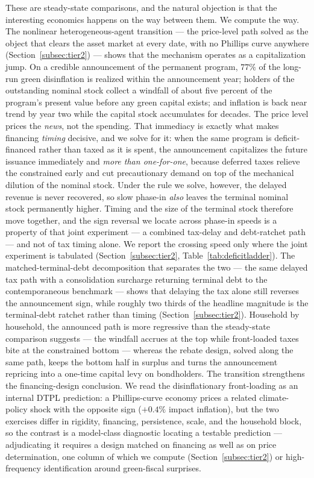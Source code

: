 \documentclass[12pt]{article}
\begin{document}
These are steady-state comparisons, and the natural objection is that the
interesting economics happens on the way between them. We compute the way.
The nonlinear heterogeneous-agent transition --- the price-level path
solved as the object that clears the asset market at every date, with no
Phillips curve anywhere (Section~\ref{subsec:tier2}) --- shows that the
mechanism operates as a capitalization jump. On a credible announcement of
the permanent program, $77\%$ of the long-run green disinflation is realized
within the announcement year; holders of the outstanding nominal stock
collect a windfall of about five percent of the program's present value
before any green capital exists; and inflation is back near trend by year two
while the capital stock accumulates for decades. The price level prices the
\emph{news}, not the spending. That immediacy is exactly what makes
financing \emph{timing} decisive, and we solve for it: when the same
program is deficit-financed rather than taxed as it is spent, the
announcement capitalizes the future issuance immediately and
\emph{more than one-for-one}, because deferred taxes relieve the
constrained early and cut precautionary demand on top of the mechanical
dilution of the nominal stock. Under the rule we solve, however, the delayed revenue is never
recovered, so slow phase-in \emph{also} leaves the terminal nominal stock
permanently higher. Timing and the size of the terminal stock therefore move
together, and the sign reversal we locate across phase-in speeds is a
property of that joint experiment --- a combined tax-delay and debt-ratchet
path --- and not of tax timing alone. We report the crossing speed only where
the joint experiment is tabulated (Section~\ref{subsec:tier2},
Table~\ref{tab:deficitladder}). The matched-terminal-debt decomposition that
separates the two --- the same delayed tax path with a consolidation
surcharge returning terminal debt to the contemporaneous benchmark ---
shows that delaying the tax alone still reverses the announcement sign,
while roughly two thirds of the headline magnitude is the terminal-debt
ratchet rather than timing (Section~\ref{subsec:tier2}). Household by household, the announced path is
more regressive than the steady-state comparison suggests --- the
windfall accrues at the top while front-loaded taxes bite at the constrained
bottom --- whereas the rebate design, solved along the same path, keeps the
bottom half in surplus and turns the announcement repricing into a one-time
capital levy on bondholders. The transition strengthens the financing-design
conclusion. We read the disinflationary front-loading as an internal DTPL
prediction: a Phillips-curve economy prices a related climate-policy shock
with the opposite sign ($+0.4\%$ impact inflation), but the two exercises
differ in rigidity, financing, persistence, scale, and the household block,
so the contrast is a model-class diagnostic locating a testable prediction
--- adjudicating it requires a design matched on financing as well as on
price determination, one column of which we compute
(Section~\ref{subsec:tier2}) or high-frequency
identification around green-fiscal surprises.
\end{document}
